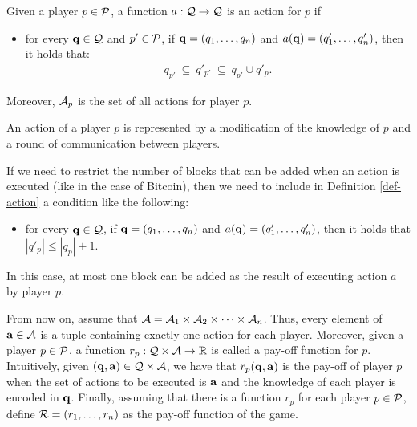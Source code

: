 
\begin{mydef}\label{def-action}
Given a player $p \in \mathcal{P}$, a function $a : \mathcal{Q} \to \mathcal{Q}$ is an action for $p$ if
\begin{itemize}
\item for every $\mathbf{q} \in \mathcal{Q}$ and $p' \in \mathcal{P}$, if $\mathbf{q} = (q_1, \ldots, q_n)$ and $a(\mathbf{q}) = (q'_1, \ldots, q'_n)$, then it holds that:
\begin{eqnarray*}
q_{p'} \ \subseteq \ q'_{p'} \ \subseteq \ q_{p'} \cup q'_p.
\end{eqnarray*}

\end{itemize}
Moreover, $\mathcal{A}_p$ is the set of all actions for player $p$.
\end{mydef}
An action of a player $p$ is represented by a modification of the knowledge of $p$ and a round of communication between players. 

If we need to restrict the number of blocks that can be added when an action is executed (like in the case of Bitcoin), then we need to include in Definition \ref{def-action} a condition like the following:
\begin{itemize}
\item for every $\mathbf{q} \in \mathcal{Q}$, if $\mathbf{q} = (q_1, \ldots, q_n)$ and $a(\mathbf{q}) = (q'_1, \ldots, q'_n)$, then it holds that $|q'_p| \leq |q_p| + 1$.
\end{itemize}
In this case, at most one block can be added as the result of executing action $a$ by player $p$. 

From now on, assume that $\mathcal{A} = \mathcal{A}_{1} \times \mathcal{A}_{2} \times \cdots \times \mathcal{A}_{n}$. Thus, every element of $\mathbf{a} \in \mathcal{A}$ is a tuple containing exactly one action for each player. Moreover, given a player $p \in \mathcal{P}$, a function $r_p : \mathcal{Q} \times \mathcal{A} \to \mathbb{R}$ is called a pay-off function for $p$. Intuitively, given $(\mathbf{q}, \mathbf{a}) \in \mathcal{Q} \times \mathcal{A}$, we have that $r_p(\mathbf{q}, \mathbf{a})$ is the pay-off of player $p$ when the set of actions to be executed is $\mathbf{a}$ and the knowledge of each player is encoded in $\mathbf{q}$. Finally, assuming that there is a  function $r_p$ for each player $p \in \mathcal{P}$, define $\mathcal{R} = (r_1, \ldots, r_n)$ as the pay-off function of the game.

